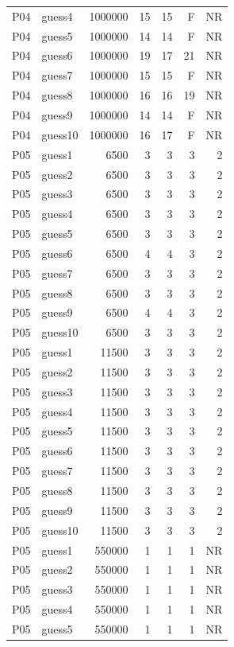 {\begin{longtable}{llrrrrr}
P04 & guess4 & 1000000 & 15 & 15 & F & NR \\
P04 & guess5 & 1000000 & 14 & 14 & F & NR \\
P04 & guess6 & 1000000 & 19 & 17 & 21 & NR \\
P04 & guess7 & 1000000 & 15 & 15 & F & NR \\
P04 & guess8 & 1000000 & 16 & 16 & 19 & NR \\
P04 & guess9 & 1000000 & 14 & 14 & F & NR \\
P04 & guess10 & 1000000 & 16 & 17 & F & NR \\
P05 & guess1 & 6500 & 3 & 3 & 3 & 2 \\
P05 & guess2 & 6500 & 3 & 3 & 3 & 2 \\
P05 & guess3 & 6500 & 3 & 3 & 3 & 2 \\
P05 & guess4 & 6500 & 3 & 3 & 3 & 2 \\
P05 & guess5 & 6500 & 3 & 3 & 3 & 2 \\
P05 & guess6 & 6500 & 4 & 4 & 3 & 2 \\
P05 & guess7 & 6500 & 3 & 3 & 3 & 2 \\
P05 & guess8 & 6500 & 3 & 3 & 3 & 2 \\
P05 & guess9 & 6500 & 4 & 4 & 3 & 2 \\
P05 & guess10 & 6500 & 3 & 3 & 3 & 2 \\
P05 & guess1 & 11500 & 3 & 3 & 3 & 2 \\
P05 & guess2 & 11500 & 3 & 3 & 3 & 2 \\
P05 & guess3 & 11500 & 3 & 3 & 3 & 2 \\
P05 & guess4 & 11500 & 3 & 3 & 3 & 2 \\
P05 & guess5 & 11500 & 3 & 3 & 3 & 2 \\
P05 & guess6 & 11500 & 3 & 3 & 3 & 2 \\
P05 & guess7 & 11500 & 3 & 3 & 3 & 2 \\
P05 & guess8 & 11500 & 3 & 3 & 3 & 2 \\
P05 & guess9 & 11500 & 3 & 3 & 3 & 2 \\
P05 & guess10 & 11500 & 3 & 3 & 3 & 2 \\
P05 & guess1 & 550000 & 1 & 1 & 1 & NR \\
P05 & guess2 & 550000 & 1 & 1 & 1 & NR \\
P05 & guess3 & 550000 & 1 & 1 & 1 & NR \\
P05 & guess4 & 550000 & 1 & 1 & 1 & NR \\
P05 & guess5 & 550000 & 1 & 1 & 1 & NR \\

\end{longtable}}
